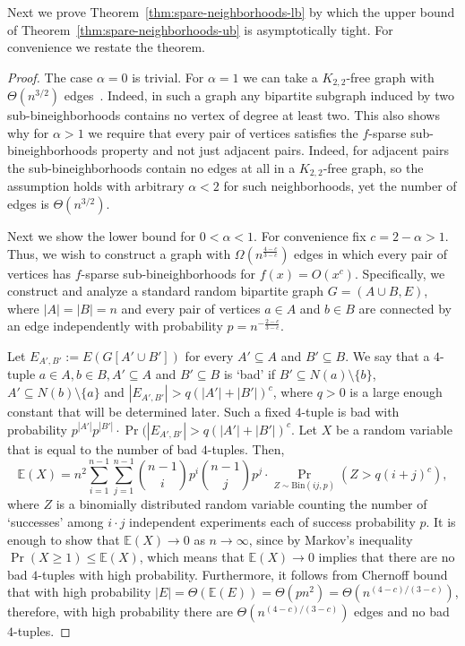 \documentclass[11pt]{article}
\theoremstyle{definition}
\newcommand{\E}[1]{\mathbb{E}(#1)}
\begin{document}
Next we prove Theorem~\ref{thm:spare-neighborhoods-lb} by which the upper bound of Theorem~\ref{thm:spare-neighborhoods-ub} is asymptotically tight.
For convenience we restate the theorem.
\KSTlb*

\begin{proof}
	The case $\alpha = 0$ is trivial.
	For $\alpha = 1$ we can take a $K_{2,2}$-free graph with $\Theta(n^{3/2})$ edges~\cite{Kovari}. Indeed, in such a graph any bipartite subgraph induced by two sub-bineighborhoods contains no vertex of degree at least two.
	This also shows why for $\alpha > 1$ we require that every pair of vertices satisfies the $f$-sparse sub-bineighborhoods property and not just adjacent pairs. Indeed, for adjacent pairs the sub-bineighborhoods contain no edges at all in a $K_{2,2}$-free graph, so the assumption holds with arbitrary $\alpha<2$ for such neighborhoods, yet the number of edges is $\Theta(n^{3/2})$.
	
	Next we show the lower bound for $0 < \alpha < 1$.
	For convenience fix $c = 2-\alpha> 1$.
	Thus, we wish to construct a graph with $\Omega\left(n^{\frac{4-c}{3-c}}\right)$ edges in which every pair of vertices has $f$-sparse sub-bineighborhoods for $f(x)=O(x^c)$.
	Specifically, we construct and analyze a standard random bipartite graph $G=(A\cup B,E)$, where $|A|=|B|=n$ and every pair of vertices $a \in A$ and $b \in B$ are connected by an edge independently with probability $p=n^{-\frac{2-c}{3-c}}$.
	
	Let $E_{A',B'} := E(G[A'\cup B'])$ for every $A' \subseteq A$ and $B' \subseteq B$.
	We say that a $4$-tuple $a \in A, b \in B, A' \subseteq A$ and $B' \subseteq B$ is `bad' if
	$B' \subseteq N(a) \setminus \{b\}$, $A' \subseteq N(b)\setminus \{a\}$ and $|E_{A',B'}| > q(|A'|+|B'|)^{c}$, where $q>0$ is a large enough constant that will be determined later.
	Such a fixed $4$-tuple is bad with probability $p^{|A'|}p^{|B'|} \cdot \Pr(|E_{A',B'}| > q(|A'|+|B'|)^{c}$.
	Let $X$ be a random variable that is equal to the number of bad $4$-tuples.
	Then,  	
	$$\E{X} = n^2 \sum_{i=1}^{n-1} \sum_{j=1}^{n-1} {{n-1}\choose{i}} p^i {{n-1}\choose{j}} p^j \cdot \underset{Z \sim \textrm{Bin}(ij,p)}{\Pr}\left(Z > q(i+j)^{c}\right),$$ where $Z$ is a binomially distributed random variable counting the number of `successes' among $i\cdot j$ independent experiments each of success probability $p$.
	It is enough to show that $\E{X} \rightarrow 0$ as $n \rightarrow \infty$, since by Markov's inequality $\Pr(X \ge 1) \le \E{X}$, which means that $\E{X} \rightarrow 0$ implies that there are no bad $4$-tuples with high probability.
	Furthermore, it follows from Chernoff bound that with high probability $|E|=\Theta(\E{E}) = \Theta(pn^2) = \Theta(n^{(4-c)/(3-c)})$, therefore, with high probability there are $\Theta(n^{(4-c)/(3-c)})$ edges and no bad $4$-tuples.
	

\end{proof}
\end{document}
